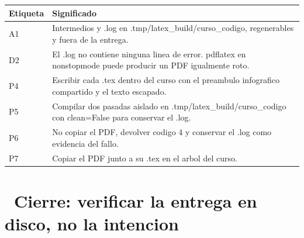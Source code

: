 \documentclass[11pt,a4paper]{article}
\newcommand{\iconotexto}[2]{\textcolor{cyanNeon}{\faIcon{#1}}~#2}
\begin{document}
\vspace{6pt}
\begin{tcolorbox}[cajaContenido, title={\faIcon{table}~Leyenda de etiquetas}]
\small
\begin{tabularx}{\linewidth}{@{}>{\centering\arraybackslash}p{1.4cm}X@{}}
\toprule
\textbf{Etiqueta} & \textbf{Significado} \\ \midrule
A1 & Intermedios y .log en .tmp/latex\_build/curso\_codigo, regenerables y fuera de la entrega. \\
D2 & El .log no contiene ninguna linea de error. pdflatex en nonstopmode puede producir un PDF igualmente roto. \\
P4 & Escribir cada .tex dentro del curso con el preambulo infografico compartido y el texto escapado. \\
P5 & Compilar dos pasadas aislado en .tmp/latex\_build/curso\_codigo con clean=False para conservar el .log. \\
P6 & No copiar el PDF, devolver codigo 4 y conservar el .log como evidencia del fallo. \\
P7 & Copiar el PDF junto a su .tex en el arbol del curso. \\
\bottomrule
\end{tabularx}
\end{tcolorbox}

\section{\iconotexto{check-circle}{Cierre: verificar la entrega en disco, no la intencion}}

\begin{center}
\end{center}
\end{document}

